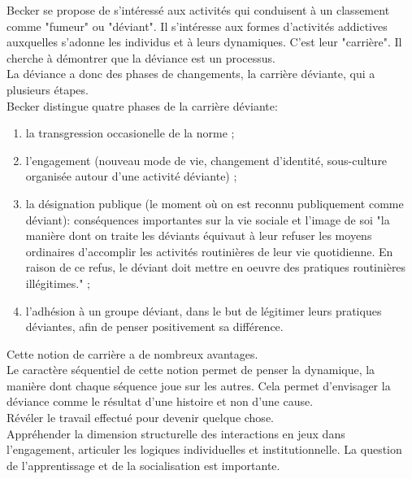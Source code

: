\documentclass[10pt, a4paper, openany]{book}
\begin{document}
Becker se propose de s'intéressé aux activités qui conduisent à un classement comme "fumeur" ou "déviant". Il s'intéresse aux formes d'activités addictives auxquelles s'adonne les individus et à leurs dynamiques. C'est leur "carrière". Il cherche à démontrer que la déviance est un processus. \\
La déviance a donc des phases de changements, la carrière déviante, qui a plusieurs étapes. \\
Becker distingue quatre phases de la carrière déviante:
\begin{enumerate}
\item la transgression occasionelle de la norme ;
\item l'engagement (nouveau mode de vie, changement d'identité, sous-culture organisée autour d'une activité déviante) ;
\item la désignation publique (le moment où on est reconnu publiquement comme déviant): conséquences importantes sur la vie sociale et l'image de soi "la manière dont on traite les déviants équivaut à leur refuser les moyens ordinaires d'accomplir les activités routinières de leur vie quotidienne. En raison de ce refus, le déviant doit mettre en oeuvre des pratiques routinières illégitimes." ;
\item l'adhésion à un groupe déviant, dans le but de légitimer leurs pratiques déviantes, afin de penser positivement sa différence. 
\end{enumerate}
Cette notion de carrière a de nombreux avantages. \\ 
Le caractère séquentiel de cette notion permet de penser la dynamique, la manière dont chaque séquence joue sur les autres. Cela permet d'envisager la déviance comme le résultat d'une histoire et non d'une cause. \\
Révéler le travail effectué pour devenir quelque chose. \\
Appréhender la dimension structurelle des interactions en jeux dans l'engagement, articuler les logiques individuelles et institutionnelle. La question de l'apprentissage et de la socialisation est importante.
\end{document}
